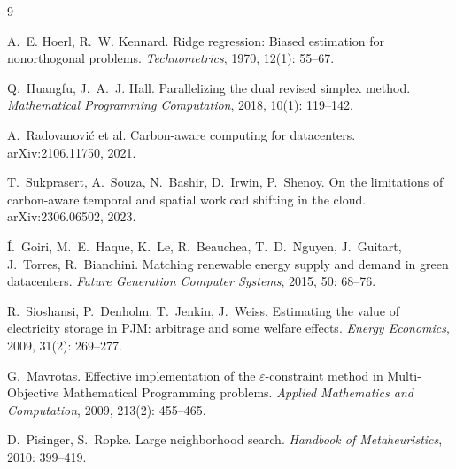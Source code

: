 \begin{thebibliography}{9}

 A.~E. Hoerl, R.~W. Kennard. Ridge regression: Biased estimation for nonorthogonal problems. \textit{Technometrics}, 1970, 12(1): 55--67.

 Q.~Huangfu, J.~A.~J. Hall. Parallelizing the dual revised simplex method. \textit{Mathematical Programming Computation}, 2018, 10(1): 119--142.

 A.~Radovanović et al. Carbon-aware computing for datacenters. arXiv:2106.11750, 2021.

 T.~Sukprasert, A.~Souza, N.~Bashir, D.~Irwin, P.~Shenoy. On the limitations of carbon-aware temporal and spatial workload shifting in the cloud. arXiv:2306.06502, 2023.

 \'I.~Goiri, M.~E.~Haque, K.~Le, R.~Beauchea, T.~D.~Nguyen, J.~Guitart, J.~Torres, R.~Bianchini. Matching renewable energy supply and demand in green datacenters. \textit{Future Generation Computer Systems}, 2015, 50: 68--76.

 R.~Sioshansi, P.~Denholm, T.~Jenkin, J.~Weiss. Estimating the value of electricity storage in PJM: arbitrage and some welfare effects. \textit{Energy Economics}, 2009, 31(2): 269--277.

 G.~Mavrotas. Effective implementation of the $\varepsilon$-constraint method in Multi-Objective Mathematical Programming problems. \textit{Applied Mathematics and Computation}, 2009, 213(2): 455--465.

 D.~Pisinger, S.~Ropke. Large neighborhood search. \textit{Handbook of Metaheuristics}, 2010: 399--419.

\end{thebibliography}
